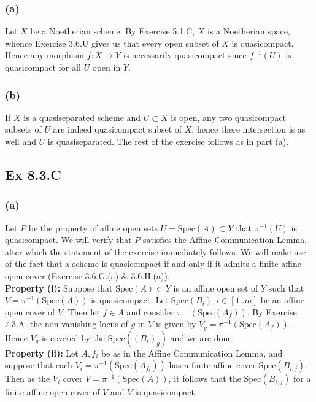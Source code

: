\documentclass{article}
\theoremstyle{definition}
\newcommand{\Spec}{\text{Spec}}
\begin{document}
	\subsubsection*{(a)}

	Let $X$ be a Noetherian scheme. By Exercise 5.1.C, $X$ is a Noetherian space,
	whence Exercise 3.6.U gives us that every open subset of $X$ is quasicompact.
	Hence any morphism $f: X \to Y$ is necessarily quasicompact since $f^{-1}(U)$
	is quasicompact for all $U$ open in $Y$.

	\subsubsection*{(b)}

	If $X$ is a quasiseparated scheme and $U \subset X$ is open, any two
	quasicompact subsets of $U$ are indeed quasicompact subset of $X$, hence there
	intersection is as well and $U$ is quasiseparated. The rest of the exercise
	follows as in part (a).


	\subsection*{Ex 8.3.C}

	\subsubsection*{(a)}

	Let $P$ be the property of affine open sets $U = \Spec(A) \subset Y$ that
$\pi^{-1}(U)$ is quasicompact. We will verify that $P$ satisfies the Affine
	Communication Lemma, after which the statement of the exercise immediately
	follows. We will make use of the fact that a scheme is quasicompact if and only
	if it admits a finite affine open cover (Exercise 3.6.G.(a) \& 3.6.H.(a)). \\

	\textbf{Property (i): } Suppose that $\Spec(A) \subset Y$ is an affine open set
	of $Y$ such that $V = \pi^{-1}(\Spec(A))$ is quasicompact. Let $\Spec(B_i), i
\in [1..m]$ be an affine open cover of $V$. Then let $f \in A$ and consider
$\pi^{-1}(\Spec(A_f))$. By Exercise 7.3.A, the non-vanishing locus of $g$ in
$V$ is given by $V_g = \pi^{-1}(\Spec(A_f))$. Hence $V_g$ is covered by the
$\Spec((B_i)_g)$ and we are done. \\

	\textbf{Property (ii): } Let $A, f_i$ be as in the Affine Communication Lemma,
	and suppose that each $V_i = \pi^{-1}(\Spec(A_{f_i}))$ has a finite affine
	cover $\Spec(B_{i, j})$. Then as the $V_i$ cover $V = \pi^{-1}(\Spec(A))$, it
	follows that the $\Spec(B_{i, j})$ for a finite affine open cover of $V$ and
$V$ is quasicompact.
\end{document}
